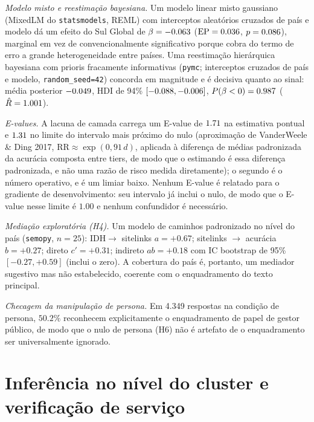 \documentclass[11pt,a4paper]{article}
\begin{document}
\emph{Modelo misto e reestimação bayesiana.} Um modelo linear misto gaussiano
(MixedLM do \texttt{statsmodels}, REML) com interceptos aleatórios cruzados de país
e modelo dá um efeito do Sul Global de $\beta=-0.063$ ($\mathrm{EP}=0.036$,
$p=0.086$), marginal em vez de convencionalmente significativo porque cobra do
termo de erro a grande heterogeneidade entre países. Uma reestimação hierárquica
bayesiana com prioris fracamente informativas (\texttt{pymc}; interceptos cruzados
de país e modelo, \texttt{random\_seed=42}) concorda em magnitude e é decisiva
quanto ao sinal: média posterior $-0.049$, HDI de 94\% $[-0.088,-0.006]$,
$P(\beta<0)=0.987$ ($\hat{R}=1.001$).

\emph{E-values.} A lacuna de camada carrega um E-value de $1.71$ na estimativa
pontual e $1.31$ no limite do intervalo mais próximo do nulo (aproximação de
VanderWeele \& Ding 2017, $\mathrm{RR}\approx\exp(0,91\,d)$, aplicada à diferença
de médias padronizada da acurácia composta entre tiers, de modo que o estimando
é essa diferença padronizada, e não uma razão de risco medida diretamente); o
segundo é o número operativo, e é um limiar baixo. Nenhum E-value é relatado para o gradiente de
desenvolvimento: seu intervalo já inclui o nulo, de modo que o E-value nesse limite
é $1.00$ e nenhum confundidor é necessário.

\emph{Mediação exploratória (H4).} Um modelo de caminhos padronizado no nível do
país (\texttt{semopy}, $n=25$): $\mathrm{IDH}\rightarrow$ sitelinks $a=+0.67$;
sitelinks $\rightarrow$ acurácia $b=+0.27$; direto $c'=+0.31$; indireto
$ab=+0.18$ com IC bootstrap de 95\% $[-0.27,+0.59]$ (inclui o zero). A cobertura do
país é, portanto, um mediador sugestivo mas não estabelecido, coerente com o
enquadramento do texto principal.

\emph{Checagem da manipulação de persona.} Em 4.349 respostas na condição de
persona, $50.2\%$ reconhecem explicitamente o enquadramento de papel de gestor
público, de modo que o nulo de persona (H6) não é artefato de o enquadramento ser
universalmente ignorado.

\section{Inferência no nível do cluster e verificação de serviço}\label{sec:s-cluster}
\end{document}
